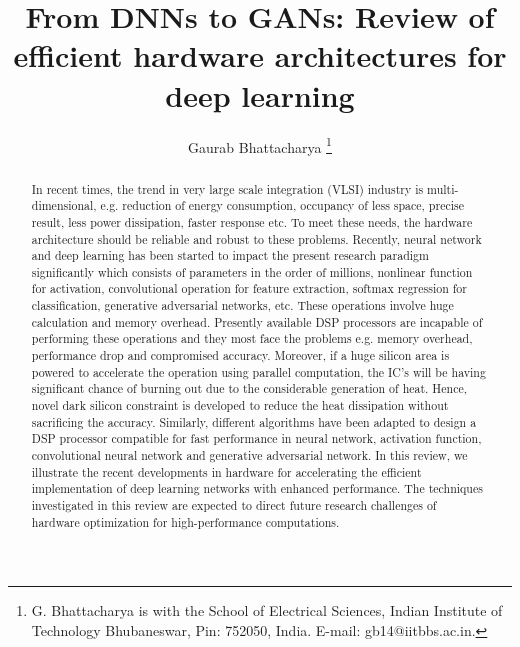 \documentclass[journal]{IEEEtran}
\begin{document}
\title{From DNNs to GANs: Review of efficient hardware architectures for deep learning}

\author{Gaurab Bhattacharya
\thanks{G. Bhattacharya is with the School of Electrical Sciences, Indian Institute of Technology Bhubaneswar, Pin: 752050, India. \protect E-mail: gb14@iitbbs.ac.in.}}

\maketitle

\begin{abstract}
In recent times, the trend in very large scale integration (VLSI) industry is multi-dimensional, e.g. reduction of energy consumption, occupancy of less space, precise result, less power dissipation, faster response etc. To meet these needs, the hardware architecture should be reliable and robust to these problems. Recently, neural network and deep learning has been started to impact the present research paradigm significantly which consists of parameters in the order of millions, nonlinear function for activation, convolutional operation for feature extraction, softmax regression for classification, generative adversarial networks, etc. These operations involve huge calculation and memory overhead. Presently available DSP processors are incapable of performing these operations and they most face the problems e.g. memory overhead, performance drop and compromised accuracy. Moreover, if a huge silicon area is powered to accelerate the operation using parallel computation, the IC’s will be having significant chance of burning out due to the considerable generation of heat. Hence, novel dark silicon constraint is developed to reduce the heat dissipation without sacrificing the accuracy. Similarly, different algorithms have been adapted to design a DSP processor compatible for fast performance in neural network, activation function, convolutional neural network and generative adversarial network. In this review, we illustrate the recent developments in hardware for accelerating the efficient implementation of deep learning networks with enhanced performance. The techniques investigated in this review are expected to direct future research challenges of hardware optimization for high-performance computations.
\end{abstract}
\end{document}
